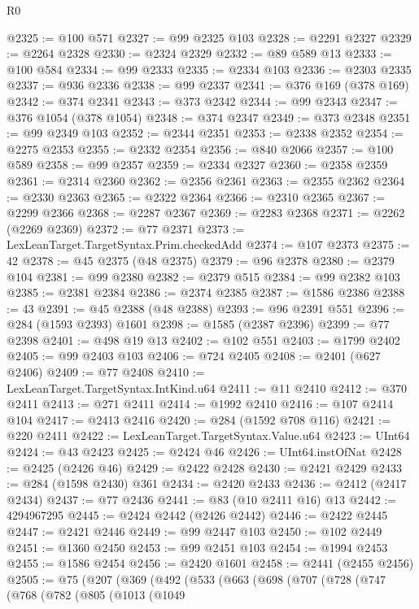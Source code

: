 \begin{lexlean}{R0}
\begin{coremodule}
@2325 := @100 @571
@2327 := @99 @2325 @103
@2328 := @2291 @2327
@2329 := @2264 @2328
@2330 := @2324 @2329
@2332 := @89 @589 @13
@2333 := @100 @584
@2334 := @99 @2333
@2335 := @2334 @103
@2336 := @2303 @2335
@2337 := @936 @2336
@2338 := @99 @2337
@2341 := @376 @169 (@378 @169)
@2342 := @374 @2341
@2343 := @373 @2342
@2344 := @99 @2343
@2347 := @376 @1054 (@378 @1054)
@2348 := @374 @2347
@2349 := @373 @2348
@2351 := @99 @2349 @103
@2352 := @2344 @2351
@2353 := @2338 @2352
@2354 := @2275 @2353
@2355 := @2332 @2354
@2356 := @840 @2066
@2357 := @100 @589
@2358 := @99 @2357
@2359 := @2334 @2327
@2360 := @2358 @2359
@2361 := @2314 @2360
@2362 := @2356 @2361
@2363 := @2355 @2362
@2364 := @2330 @2363
@2365 := @2322 @2364
@2366 := @2310 @2365
@2367 := @2299 @2366
@2368 := @2287 @2367
@2369 := @2283 @2368
@2371 := @2262 (@2269 @2369)
@2372 := @77 @2371
@2373 := LexLeanTarget.TargetSyntax.Prim.checkedAdd
@2374 := @107 @2373
@2375 := 42
@2378 := @45 @2375 (@48 @2375)
@2379 := @96 @2378
@2380 := @2379 @104
@2381 := @99 @2380
@2382 := @2379 @515
@2384 := @99 @2382 @103
@2385 := @2381 @2384
@2386 := @2374 @2385
@2387 := @1586 @2386
@2388 := 43
@2391 := @45 @2388 (@48 @2388)
@2393 := @96 @2391 @551
@2396 := @284 (@1593 @2393) @1601
@2398 := @1585 (@2387 @2396)
@2399 := @77 @2398
@2401 := @498 @19 @13
@2402 := @102 @551
@2403 := @1799 @2402
@2405 := @99 @2403 @103
@2406 := @724 @2405
@2408 := @2401 (@627 @2406)
@2409 := @77 @2408
@2410 := LexLeanTarget.TargetSyntax.IntKind.u64
@2411 := @11 @2410
@2412 := @370 @2411
@2413 := @271 @2411
@2414 := @1992 @2410
@2416 := @107 @2414 @104
@2417 := @2413 @2416
@2420 := @284 (@1592 @708 @116)
@2421 := @220 @2411
@2422 := LexLeanTarget.TargetSyntax.Value.u64
@2423 := UInt64
@2424 := @43 @2423
@2425 := @2424 @46
@2426 := UInt64.instOfNat
@2428 := @2425 (@2426 @46)
@2429 := @2422 @2428
@2430 := @2421 @2429
@2433 := @284 (@1598 @2430) @361
@2434 := @2420 @2433
@2436 := @2412 (@2417 @2434)
@2437 := @77 @2436
@2441 := @83 (@10 @2411 @16) @13
@2442 := 4294967295
@2445 := @2424 @2442 (@2426 @2442)
@2446 := @2422 @2445
@2447 := @2421 @2446
@2449 := @99 @2447 @103
@2450 := @102 @2449
@2451 := @1360 @2450
@2453 := @99 @2451 @103
@2454 := @1994 @2453
@2455 := @1586 @2454
@2456 := @2420 @1601
@2458 := @2441 (@2455 @2456)
@2505 := @75
    (@207
      (@369
        (@492
          (@533
            (@663
              (@698
                (@707
                  (@728
                    (@747
                      (@768
                        (@782
                          (@805
                            (@1013
                              (@1049

\end{coremodule}
\end{lexlean}
